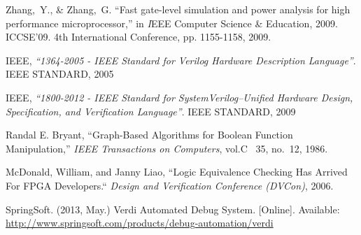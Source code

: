 \begin{thebibliography}{10}
Zhang,~Y., & Zhang,~G. ``Fast gate-level simulation and power analysis for high performance microprocessor,'' in {\emph IEEE Computer Science & Education, 2009. ICCSE'09. 4th International Conference}, pp. 1155-1158, 2009.


  IEEE,
  \emph{``1364-2005 - IEEE Standard for Verilog Hardware Description
  Language''}.
	IEEE STANDARD,
	2005

  IEEE,
	\emph{``1800-2012 - IEEE Standard for SystemVerilog--Unified Hardware Design,
  Specification, and Verification Language''}.
	IEEE STANDARD,
	2009

Randal E. Bryant,
  ``Graph-Based Algorithms for Boolean Function Manipulation,'' \emph{IEEE Transactions on Computers}, vol.C ~35, no.~12, 1986.

McDonald, William, and Janny Liao,
	``Logic Equivalence Checking Has Arrived For FPGA Developers.`` \emph{Design and Verification Conference (DVCon)}, 2006.

\BIBentryALTinterwordspacing
SpringSoft. (2013, May.) {Verdi Automated Debug System}. [Online]. Available:
  \url{http://www.springsoft.com/products/debug-automation/verdi}
\BIBentrySTDinterwordspacing


\end{thebibliography}
